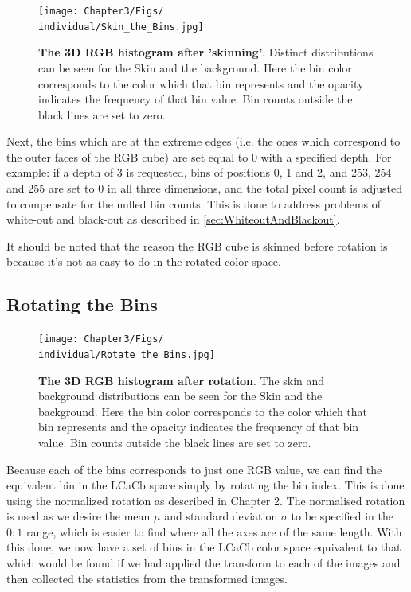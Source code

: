 \begin{figure}[h!]
  \centering
    \texttt{[image: Chapter3/Figs/\\individual/Skin\_the\_Bins.jpg]}
        \caption{\textbf{The 3D RGB histogram after 'skinning'}. Distinct distributions can be seen for the Skin and the background. Here the bin color corresponds to the color which that bin represents and the opacity indicates the frequency of that bin value. Bin counts outside the black lines are set to zero. }  \label{fig:Skin_the_Bins}
    \end{figure}

Next, the bins which are at the extreme edges (i.e. the ones which correspond to the outer faces of the RGB cube) are set equal to 0 with a specified depth. For example: if a depth of 3 is requested, bins of positions 0, 1 and 2, and 253, 254 and 255 are set to 0 in all three dimensions, and the total pixel count is adjusted to compensate for the nulled bin counts. This is done to address problems of white-out and black-out as described in \ref{sec:WhiteoutAndBlackout}.



It should be noted that the reason the RGB cube is skinned before rotation is because it's not as easy to do in the rotated color space.


\subsection{Rotating the Bins}\label{sec:RotatingTheBins}

\begin{figure}[h!]
  \centering
    \texttt{[image: Chapter3/Figs/\\individual/Rotate\_the\_Bins.jpg]}
        \caption{\textbf{The 3D RGB histogram after rotation}. The skin and background distributions can be seen for the Skin and the background. Here the bin color corresponds to the color which that bin represents and the opacity indicates the frequency of that bin value. Bin counts outside the black lines are set to zero. }   \label{fig:Rotate_the_Bins}
\end{figure}

Because each of the bins corresponds to just one RGB value, we can find the equivalent bin in the LCaCb space simply by rotating the bin index. This is done using the normalized rotation as described in Chapter 2. The normalised rotation is used as we desire the mean $\mu$ and standard deviation $\sigma$ to be specified in the $0:1$ range, which is easier to find where all the axes are of the same length. With this done, we now have a set of bins in the LCaCb color space equivalent to that which would be found if we had applied the transform to each of the images and then collected the statistics from the transformed images.





